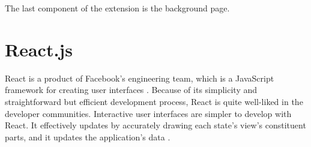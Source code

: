 The last component of the extension is the background page.


\section{React.js}

React is a product of Facebook's engineering team, which is a JavaScript framework for creating user interfaces \autocite{gackenheimer2015introducing}. Because of its simplicity and straightforward but efficient development process, React is quite well-liked in the developer communities. Interactive user interfaces are simpler to develop with React. It effectively updates by accurately drawing each state's view's constituent parts, and it updates the application's data \autocite{islam2017reactjs}.
